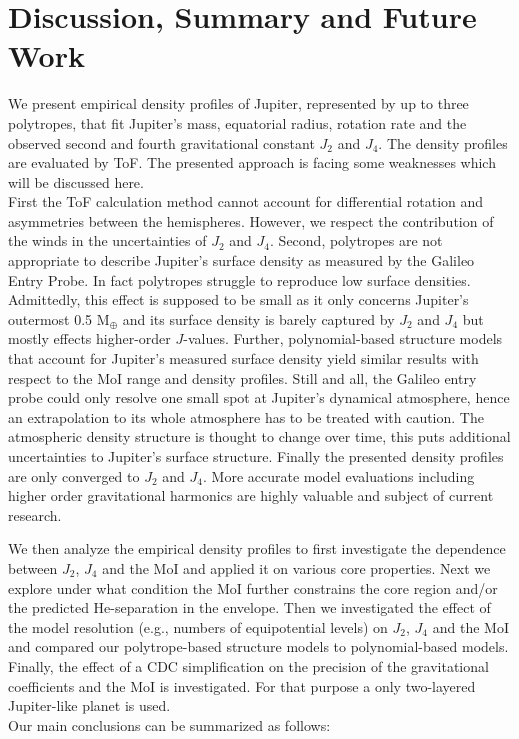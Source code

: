 \documentclass[usenatbib]{mnras}
\newcommand{\sub}[1]{_{\text{#1}}}
\begin{document}
\section{Discussion, Summary and Future Work}\label{sec:summary}
We present empirical density profiles of Jupiter, represented by up to three polytropes, that fit Jupiter's mass, equatorial radius, rotation rate and the observed second and fourth gravitational constant $J_2$ and $J_4$. The density profiles are evaluated by ToF. The presented approach is facing some weaknesses which will be discussed here. \\
First the ToF calculation method cannot account for differential rotation and asymmetries between the hemispheres. However, we respect the contribution of the winds in the uncertainties of $J_2$ and $J_4$. Second, polytropes are not appropriate to describe Jupiter's surface density as measured by the Galileo Entry Probe. In fact polytropes struggle to reproduce low surface densities. Admittedly, this effect is supposed to be small as it only concerns Jupiter's outermost 0.5 M$_\oplus$ and its surface density is barely captured by $J_2$ and $J_4$ but mostly effects higher-order $J$-values. Further, polynomial-based structure models that account for Jupiter's measured surface density yield similar results with respect to the MoI range and density profiles. Still and all, the Galileo entry probe could only resolve one small spot at Jupiter's dynamical atmosphere, hence an extrapolation to its whole atmosphere has to be treated with caution. The atmospheric density structure is thought to change over time, this puts additional uncertainties to Jupiter's surface structure. Finally the presented density profiles are only converged to $J_2$ and $J_4$. More accurate model evaluations including higher order gravitational harmonics are highly valuable and subject of current research. 

We then analyze the empirical density profiles to first investigate the dependence between $J_2$, $J_4$ and the MoI and applied it on various core properties. Next we explore under what condition the MoI further constrains the core region and/or the predicted He-separation in the envelope. Then we investigated the effect of the model resolution (e.g., numbers of equipotential levels) on $J_2$, $J_4$ and the MoI and compared our polytrope-based structure models to polynomial-based models. Finally, the effect of a CDC simplification on the precision of the gravitational coefficients and the MoI is investigated. For that purpose a only two-layered Jupiter-like planet is used. \\
Our main conclusions can be summarized as follows:
\end{document}
